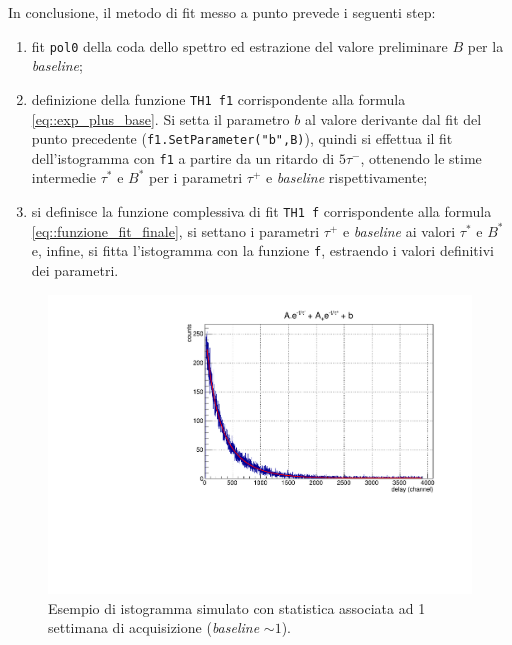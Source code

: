 \documentclass[10pt, oneside, a4paper]{article}   	%
\begin{document}
In conclusione, il metodo di fit messo a punto prevede i seguenti step:
\begin{enumerate}
 \item fit \lstinline{pol0} della coda dello spettro ed estrazione del valore preliminare $B$ per la \textit{baseline};
 \item definizione della funzione \lstinline{TH1 f1} corrispondente alla formula \ref{eq::exp_plus_base}. Si setta il parametro $b$ al valore derivante dal fit del punto precedente (\lstinline{f1.SetParameter("b",B)}), quindi si effettua il fit dell'istogramma con \lstinline{f1} a partire da un ritardo di $5\tau^-$, ottenendo le stime intermedie $\tau^*$ e $B^*$ per i parametri $\tau^+$ e \textit{baseline} rispettivamente;
 \item si definisce la funzione complessiva di fit \lstinline{TH1 f} corrispondente alla formula \ref{eq::funzione_fit_finale}, si settano i parametri $\tau^+$ e \textit{baseline} ai valori $\tau^*$ e $B^*$ e, infine, si fitta l'istogramma con la funzione \lstinline{f}, estraendo i valori definitivi dei parametri. 
\end{enumerate}
\begin{figure}
\centering
 \includegraphics[scale=0.6]{img/example_single_spectrum}
 \caption{Esempio di istogramma simulato con statistica associata ad 1 settimana di acquisizione (\textit{baseline} $\sim 1$).}
 \label{fig::esempio_spettro_simulato}
\end{figure}
%
%
%
\end{document}
